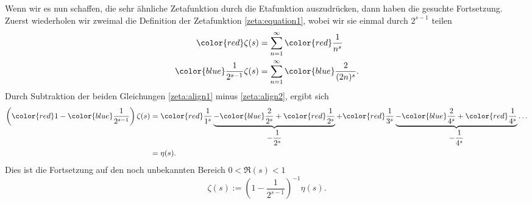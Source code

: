 Wenn wir es nun schaffen, die sehr ähnliche Zetafunktion durch die Etafunktion auszudrücken, dann haben die gesuchte Fortsetzung.
Zuerst wiederholen wir zweimal die Definition der Zetafunktion \eqref{zeta:equation1}, wobei wir sie einmal durch $2^{s-1}$ teilen
\begin{align}
    \color{red}
        \zeta(s)
    &=
    \sum_{n=1}^{\infty}
    \color{red}
        \frac{1}{n^s} \label{zeta:align1}
    \\
    \color{blue}
        \frac{1}{2^{s-1}}
        \zeta(s)
    &=
    \sum_{n=1}^{\infty}
    \color{blue}
        \frac{2}{(2n)^s}. \label{zeta:align2}
\end{align}
Durch Subtraktion der beiden Gleichungen \eqref{zeta:align1} minus \eqref{zeta:align2}, ergibt sich
\begin{align}
    \left({\color{red}1} - {\color{blue}\frac{1}{2^{s-1}}} \right)
    \zeta(s)
    &=
    {\color{red}\frac{1}{1^s}}
    \underbrace{
    -
    {\color{blue}\frac{2}{2^s}}
    +
    {\color{red}\frac{1}{2^s}}
    }_{\displaystyle{-\frac{1}{2^s}}}
    +
    {\color{red}\frac{1}{3^s}}
    \underbrace{-
    {\color{blue}\frac{2}{4^s}}
    +
    {\color{red}\frac{1}{4^s}}
    }_{\displaystyle{-\frac{1}{4^s}}}
    \ldots
    \\
    &= \eta(s).
\end{align}
Dies ist die Fortsetzung auf den noch unbekannten Bereich $0 < \Re(s) < 1$
\begin{equation} \label{zeta:equation:fortsetzung1}
    \zeta(s)
    :=
    \left(1 - \frac{1}{2^{s-1}} \right)^{-1} \eta(s).
\end{equation}

